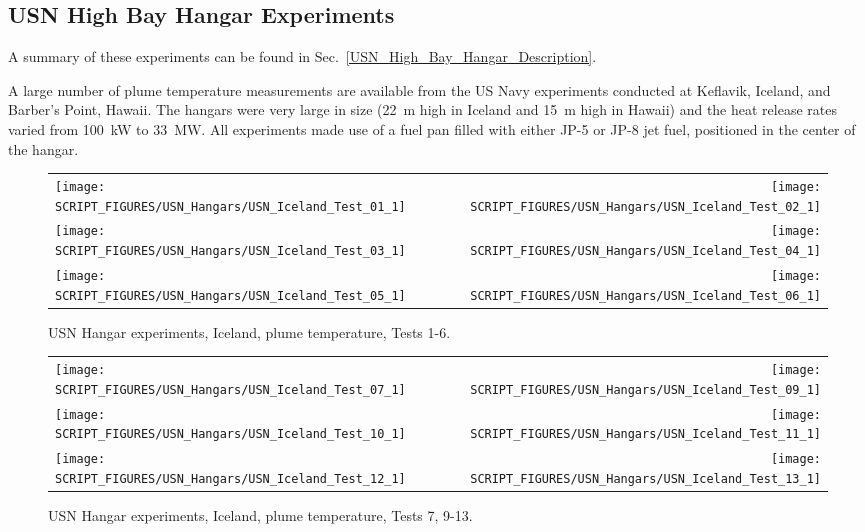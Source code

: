 \clearpage

\subsection{USN High Bay Hangar Experiments}
\label{USN_High_Bay_Hangar_Plume_Temperature}

A summary of these experiments can be found in Sec.~\ref{USN_High_Bay_Hangar_Description}.

A large number of plume temperature measurements are available from the US Navy experiments conducted at Keflavik, Iceland, and Barber's Point, Hawaii. The hangars were very large in size (22~m high in Iceland and 15~m high in Hawaii) and the heat release rates varied from 100~kW to 33~MW. All experiments made use of a fuel pan filled with either JP-5 or JP-8 jet fuel, positioned in the center of the hangar.


\begin{figure}[h!]
\begin{tabular*}{\textwidth}{l@{\extracolsep{\fill}}r}
\texttt{[image: SCRIPT\_FIGURES/USN\_Hangars/USN\_Iceland\_Test\_01\_1]} &
\texttt{[image: SCRIPT\_FIGURES/USN\_Hangars/USN\_Iceland\_Test\_02\_1]} \\
\texttt{[image: SCRIPT\_FIGURES/USN\_Hangars/USN\_Iceland\_Test\_03\_1]} &
\texttt{[image: SCRIPT\_FIGURES/USN\_Hangars/USN\_Iceland\_Test\_04\_1]} \\
\texttt{[image: SCRIPT\_FIGURES/USN\_Hangars/USN\_Iceland\_Test\_05\_1]} &
\texttt{[image: SCRIPT\_FIGURES/USN\_Hangars/USN\_Iceland\_Test\_06\_1]} \\
\end{tabular*}
\caption[USN Hangar experiments, Iceland, plume temperature, Tests 1-6]
{USN Hangar experiments, Iceland, plume temperature, Tests 1-6.}
\label{USN_Plume_Iceland_1}
\end{figure}

\newpage

\begin{figure}[p]
\begin{tabular*}{\textwidth}{l@{\extracolsep{\fill}}r}
\texttt{[image: SCRIPT\_FIGURES/USN\_Hangars/USN\_Iceland\_Test\_07\_1]} &
\texttt{[image: SCRIPT\_FIGURES/USN\_Hangars/USN\_Iceland\_Test\_09\_1]} \\
\texttt{[image: SCRIPT\_FIGURES/USN\_Hangars/USN\_Iceland\_Test\_10\_1]} &
\texttt{[image: SCRIPT\_FIGURES/USN\_Hangars/USN\_Iceland\_Test\_11\_1]} \\
\texttt{[image: SCRIPT\_FIGURES/USN\_Hangars/USN\_Iceland\_Test\_12\_1]} &
\texttt{[image: SCRIPT\_FIGURES/USN\_Hangars/USN\_Iceland\_Test\_13\_1]} \\
\end{tabular*}
\caption[USN Hangar experiments, Iceland, plume temperature, Tests 7, 9-13]
{USN Hangar experiments, Iceland, plume temperature, Tests 7, 9-13.}
\label{USN_Plume_Iceland_2}
\end{figure}

